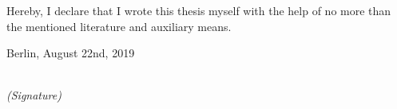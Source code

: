 \newpage

\thispagestyle{empty}

\begin{large}

\vspace*{6cm}

\noindent
Hereby, I declare that I wrote this thesis myself with the help of no more than the mentioned literature and auxiliary means.
\vspace{2cm}

\noindent
Berlin, August 22nd, 2019

\vspace{3cm}

\hspace*{7cm}%
\dotfill\\
\hspace*{8.5cm}%
\textit{(Signature)}

\end{large}
